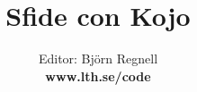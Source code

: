 \documentclass[12pt]{book}
\title{\fontsize{40}{40}\bf\sffamily\selectfont Sfide con Kojo} %
\author{Editor: Björn Regnell \\ \bf www.lth.se/code} %
\date{}
\begin{document}
\maketitle
\newpage
\thispagestyle{empty}


\newpage
\begin{multicols}{3}
\tableofcontents 
\mainmatter
\end{multicols}

\fontsize{16}{18}\selectfont\raggedright

\end{document}
